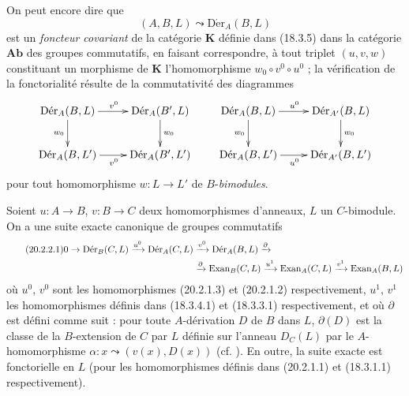 \begin{env}[20.2.1]
On peut encore dire que
\[
  (A,B,L)\leadsto\operatorname{D\acute{e}r}_A(B,L)
\]
est un \emph{foncteur covariant} de la catégorie $\boldsymbol{K}$ définie dans
(18.3.5) dans la catégorie $\boldsymbol{Ab}$ des groupes commutatifs, en
faisant correspondre, à tout triplet $(u,v,w)$ constituant un morphisme de
$\boldsymbol{K}$ l'homomorphisme $w_0\circ v^0\circ u^0$ ; la vérification de
la fonctorialité résulte de la commutativité des diagrammes
\[
\xymatrix{
  \operatorname{D\acute{e}r}_A(B,L) \ar[r]^{v^0} \ar[d]_{w_0} &
    \operatorname{D\acute{e}r}_A(B',L) \ar[d]^{w_0} \\
  \operatorname{D\acute{e}r}_A(B,L') \ar[r]_{v^0} &
    \operatorname{D\acute{e}r}_A(B',L')
}
\qquad
\xymatrix{
  \operatorname{D\acute{e}r}_A(B,L) \ar[r]^{u^0} \ar[d]_{w_0} &
    \operatorname{D\acute{e}r}_{A'}(B,L) \ar[d]^{w_0} \\
  \operatorname{D\acute{e}r}_A(B,L') \ar[r]_{u^0} &
    \operatorname{D\acute{e}r}_{A'}(B,L')
}
\]
pour tout homomorphisme $w:L\to L'$ de $B$-\emph{bimodules}.
\end{env}

\begin{theorem}[20.2.2]
\label{0.20.2.2-fr}
Soient $u:A\to B$, $v:B\to C$ deux homomorphismes d'anneaux, $L$ un
$C$-bimodule. On a une suite exacte canonique de groupes commutatifs
\begin{align}
\tag{20.2.2.1}
\label{0.20.2.2.1-fr}
  0\to\operatorname{D\acute{e}r}_B(C,L)\xrightarrow{u^0}
  \operatorname{D\acute{e}r}_A(C,L)&\xrightarrow{v^0}
  \operatorname{D\acute{e}r}_A(B,L)\xrightarrow{\partial} \\
  &\xrightarrow{\partial}\operatorname{Exan}_B(C,L)\xrightarrow{u^1}
  \operatorname{Exan}_A(C,L)\xrightarrow{v^1}
  \operatorname{Exan}_A(B,L) \notag
\end{align}
où $u^0$, $v^0$ sont les homomorphismes \textup{(20.2.1.3)} et \textup{(20.2.1.2)}
respectivement, $u^1$, $v^1$ les homomorphismes définis dans \textup{(18.3.4.1)} et
\textup{(18.3.3.1)} respectivement, et où $\partial$ est défini comme suit : pour
toute $A$-dérivation $D$ de $B$ dans $L$, $\partial(D)$ est la classe de la
$B$-extension de $C$ par $L$ définie sur l'anneau $D_C(L)$ par le
$A$-homomorphisme $\alpha:x\leadsto(v(x),D(x))$ \textup{(cf.
)}. En outre, la suite exacte \textup{} est
fonctorielle en $L$ (pour les homomorphismes définis dans \textup{(20.2.1.1)} et
\textup{(18.3.1.1)} respectivement).
\end{theorem}

